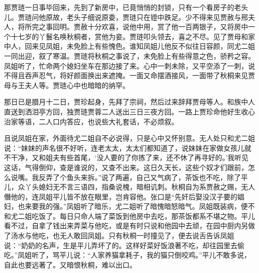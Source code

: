 \begin{parag}
    那贾琏一日事毕回来，先到了新房中，已竟悄悄的封锁，只有一个看房子的老头儿。贾琏问他原故，老头子细说原委，贾琏只在镫中跌足。少不得来见贾赦与邢夫人，将所完之事回明。贾赦十分欢喜，说他中用，赏了他一百两银子，又将房中一个十七岁的丫鬟名唤秋桐者，赏他为妾。贾琏叩头领去，喜之不尽。见了贾母和家中人，回来见凤姐，未免脸上有些愧色。谁知凤姐儿他反不似往日容颜，同尤二姐一同出迎，叙了寒温。贾琏将秋桐之事说了，未免脸上有些得意之色，骄矜之容。凤姐听了，忙命两个媳妇坐车在那边接了来。心中一刺未除，又平空添了一刺，说不得且吞声忍气，将好颜面换出来遮掩。一面又命摆酒接风，一面带了秋桐来见贾母与王夫人等。贾琏心中也暗暗的纳罕。
\end{parag}


\begin{parag}
    那日已是腊月十二日，贾珍起身，先拜了宗祠，然后过来辞拜贾母等人。和族中人直送到洒泪亭方回，独贾琏贾蓉二人送出三日三夜方回。一路上贾珍命他好生收心治家等语，二人口内答应，也说些大礼套话，不必烦叙。
\end{parag}


\begin{parag}
    且说凤姐在家，外面待尤二姐自不必说得，只是心中又怀别意。无人处只和尤二姐说：“妹妹的声名很不好听，连老太太，太太们都知道了，说妹妹在家做女孩儿就不干净，又和姐夫有些首尾，‘没人要的了你拣了来，还不休了再寻好的。’我听见这话，气得倒仰，查是谁说的，又查不出来。这日久天长，这些个奴才们跟前，怎么说嘴。我反弄了个鱼头来拆。”说了两遍，自己又气病了，茶饭也不吃，除了平儿，众丫头媳妇无不言三语四，指桑说槐，暗相讥刺。秋桐自为系贾赦之赐，无人僭他的，连凤姐平儿皆不放在眼里，岂肯容他。张口是“先奸后娶没汉子要的娼妇，也来要我的强。”凤姐听了暗乐，尤二姐听了暗愧暗怒暗气。凤姐既装病，便不和尤二姐吃饭了。每日只命人端了菜饭到他房中去吃，那茶饭都系不堪之物。平儿看不过，自拿了钱出来弄菜与他吃，或是有时只说和他园中去顽，在园中厨内另做了汤水与他吃，也无人敢回凤姐。只有秋桐一时撞见了，便去说舌告诉凤姐说：“奶奶的名声，生是平儿弄坏了的。这样好菜好饭浪著不吃，却往园里去偷吃。”凤姐听了，骂平儿说：“人家养猫拿耗子，我的猫只倒咬鸡。”平儿不敢多说，自此也要远著了。又暗恨秋桐，难以出口。
\end{parag}


